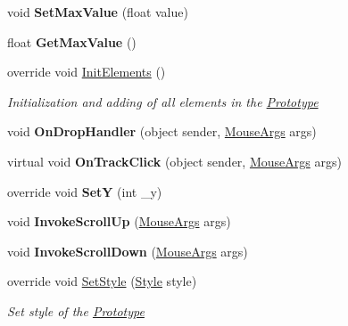 \begin{DoxyCompactItemize}
void {\bfseries Set\+Max\+Value} (float value)
\item 
\mbox{\label{class_space_v_i_l_1_1_vertical_slider_ad1a42ca80d41a1c5dc51480df5f5c360}} 
float {\bfseries Get\+Max\+Value} ()
\item 
override void \mbox{\hyperlink{class_space_v_i_l_1_1_vertical_slider_a22ab138c5fbb0bdc8c56f7673998dfcb}{Init\+Elements}} ()
\begin{DoxyCompactList}\small\item\em Initialization and adding of all elements in the \mbox{\hyperlink{class_space_v_i_l_1_1_prototype}{Prototype}} \end{DoxyCompactList}\item 
\mbox{\label{class_space_v_i_l_1_1_vertical_slider_a0a1be6c99a399f08071c642664616850}} 
void {\bfseries On\+Drop\+Handler} (object sender, \mbox{\hyperlink{class_space_v_i_l_1_1_core_1_1_mouse_args}{Mouse\+Args}} args)
\item 
\mbox{\label{class_space_v_i_l_1_1_vertical_slider_a3fdb455b5b3aa9a3d5c0c76cafc9a850}} 
virtual void {\bfseries On\+Track\+Click} (object sender, \mbox{\hyperlink{class_space_v_i_l_1_1_core_1_1_mouse_args}{Mouse\+Args}} args)
\item 
\mbox{\label{class_space_v_i_l_1_1_vertical_slider_aae371b8cd0f9fcd13e82b3ea802b93d4}} 
override void {\bfseries SetY} (int \+\_\+y)
\item 
\mbox{\label{class_space_v_i_l_1_1_vertical_slider_a74de9febfc62fbafb8d1da1f9edbcaf6}} 
void {\bfseries Invoke\+Scroll\+Up} (\mbox{\hyperlink{class_space_v_i_l_1_1_core_1_1_mouse_args}{Mouse\+Args}} args)
\item 
\mbox{\label{class_space_v_i_l_1_1_vertical_slider_a1c7d604fc76c807f450d4e8f712ce2ff}} 
void {\bfseries Invoke\+Scroll\+Down} (\mbox{\hyperlink{class_space_v_i_l_1_1_core_1_1_mouse_args}{Mouse\+Args}} args)
\item 
override void \mbox{\hyperlink{class_space_v_i_l_1_1_vertical_slider_af6e1f3b91c48cecf0bd791c787d3fe0d}{Set\+Style}} (\mbox{\hyperlink{class_space_v_i_l_1_1_decorations_1_1_style}{Style}} style)
\begin{DoxyCompactList}\small\item\em Set style of the \mbox{\hyperlink{class_space_v_i_l_1_1_prototype}{Prototype}} \end{DoxyCompactList}\end{DoxyCompactItemize}

